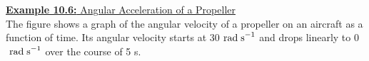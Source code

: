 \documentclass[a4paper]{article}
\let\bf\textbf
\newcommand\rads{\text{ rad\;s}^{-1}}
\begin{document}
\newpage
\begin{shaded}
    \underline{\bf{Example 10.6:} Angular Acceleration of a Propeller}
    \vspace{2mm}\\
    The figure shows a graph of the angular velocity of a propeller on an aircraft as a function of time. Its angular velocity starts at 30$\rads$ and drops linearly to 0$\rads$ over the course of 5 s.
    \begin{center}
\end{center}
\end{shaded}
\end{document}
